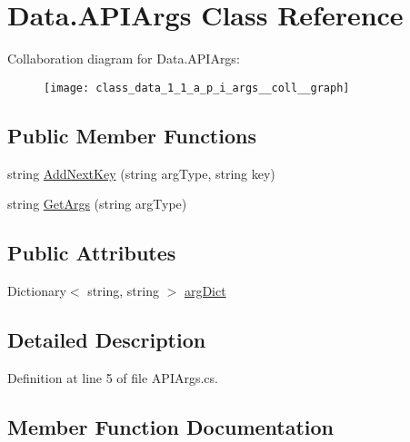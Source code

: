 \hypertarget{class_data_1_1_a_p_i_args}{}\section{Data.\+A\+P\+I\+Args Class Reference}
\label{class_data_1_1_a_p_i_args}


Collaboration diagram for Data.\+A\+P\+I\+Args\+:
\nopagebreak
\begin{figure}[H]
\begin{center}
\leavevmode
\texttt{[image: class\_data\_1\_1\_a\_p\_i\_args\_\_coll\_\_graph]}
\end{center}
\end{figure}
\subsection*{Public Member Functions}
\begin{DoxyCompactItemize}
\item 
string \hyperlink{class_data_1_1_a_p_i_args_aee8dceb9797a0fcab0c700f227cea61a}{Add\+Next\+Key} (string arg\+Type, string key)
\item 
string \hyperlink{class_data_1_1_a_p_i_args_a78c8568d1ede724c907a36454dcda88e}{Get\+Args} (string arg\+Type)
\end{DoxyCompactItemize}
\subsection*{Public Attributes}
\begin{DoxyCompactItemize}
\item 
Dictionary$<$ string, string $>$ \hyperlink{class_data_1_1_a_p_i_args_a86541aeaf3d536fa12c75ac1eb404807}{arg\+Dict}
\end{DoxyCompactItemize}


\subsection{Detailed Description}


Definition at line 5 of file A\+P\+I\+Args.\+cs.



\subsection{Member Function Documentation}

